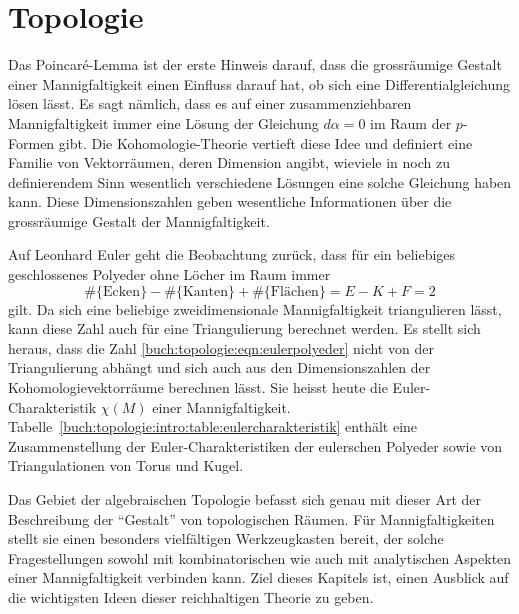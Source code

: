 %
%
%
\chapter{Topologie
\label{chapter:topologie}}
%
%
%

\noindent
Das Poincaré-Lemma ist der erste Hinweis darauf, dass die grossräumige
Gestalt einer Mannigfaltigkeit einen Einfluss darauf hat, ob sich eine
Differentialgleichung lösen lässt.
Es sagt nämlich, dass es auf einer zusammenziehbaren Mannigfaltigkeit
immer eine Lösung der Gleichung $d\alpha = 0$ im Raum der $p$-Formen
gibt.
Die Kohomologie-Theorie vertieft diese Idee und definiert eine Familie
von Vektorräumen, deren Dimension angibt, wieviele in noch zu definierendem
Sinn wesentlich verschiedene Lösungen eine solche Gleichung haben kann.
Diese Dimensionszahlen geben wesentliche Informationen über die grossräumige
Gestalt der Mannigfaltigkeit.

Auf Leonhard Euler geht die Beobachtung zurück, dass für ein beliebiges
geschlossenes Polyeder ohne Löcher im Raum immer
\begin{equation}
\#\{\text{Ecken}\}
-
\#\{\text{Kanten}\}
+
\#\{\text{Flächen}\}
=
E-K+F
=
2
\label{buch:topologie:eqn:eulerpolyeder}
\end{equation}
gilt.
Da sich eine beliebige zweidimensionale Mannigfaltigkeit triangulieren
lässt, kann diese Zahl auch für eine Triangulierung berechnet werden.
Es stellt sich heraus, dass 
die Zahl \eqref{buch:topologie:eqn:eulerpolyeder}
nicht von der Triangulierung abhängt und sich auch aus den Dimensionszahlen
der Kohomologievektorräume berechnen lässt.
Sie heisst heute die Euler-Charakteristik $\chi(M)$ einer Mannigfaltigkeit.
Tabelle~\ref{buch:topologie:intro:table:eulercharakteristik} enthält
eine Zusammenstellung der Euler-Charakteristiken der eulerschen Polyeder
sowie von Triangulationen von Torus und Kugel.

Das Gebiet der algebraischen Topologie befasst sich genau mit dieser Art
der Beschreibung der ``Gestalt'' von topologischen Räumen.
Für Mannigfaltigkeiten stellt sie einen besonders vielfältigen
Werkzeugkasten bereit, der solche Fragestellungen sowohl mit
kombinatorischen wie auch mit analytischen Aspekten einer Mannigfaltigkeit
verbinden kann.
Ziel dieses Kapitels ist, einen Ausblick auf die wichtigsten Ideen
dieser reichhaltigen Theorie zu geben.

